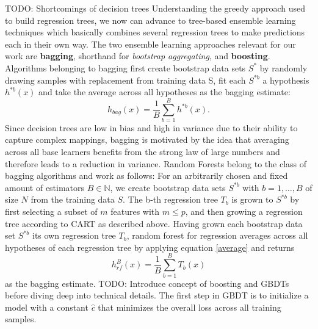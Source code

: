 \newline
\newline
TODO: Shortcomings of decision trees
\newline
\newline
Understanding the greedy approach used to build regression trees, we now can advance to tree-based ensemble learning techniques which basically combines several regression trees to make predictions each in their own way. 
The two ensemble learning approaches relevant for our work are \textbf{bagging}, shorthand for \textit{bootstrap aggregating}, and \textbf{boosting}. 
Algorithms belonging to bagging first create bootstrap data sets $ S^{*} $ by randomly drawing samples with replacement from training data S, fit each $ S^{*b} $ a hypothesis $ h^{*b}(x) $ and take the average across all hypotheses as the bagging estimate: 
\begin{equation}\label{average}
	h_{bag}(x) = \dfrac{1}{B} \sum_{b=1}^{B} h^{*b}(x).
\end{equation}
Since decision trees are low in bias and high in variance due to their ability to capture complex mappings, bagging is motivated by the idea that averaging across all base learners benefits from the strong law of large numbers and therefore leads to a reduction in variance. 
Random Forests belong to the class of bagging algorithms and work as follows:
For an arbitrarily chosen and fixed amount of estimators $ B \in \mathbb{N}$, we create bootstrap data sets $ S^{*b} $ with $ b = 1, \dots, B $ of size $ N $ from the training data $ S $. The b-th regression tree $ T_b $ is grown to $ S^{*b} $ by first selecting a subset of $ m $ features with $ m \leq p $, and then growing a regression tree according to CART as described above.
Having grown each bootstrap data set $ S^{*b} $ its own regression tree $ T_b $, random forest for regression averages across all hypotheses of each regression tree by applying equation \ref{average} and returns
\begin{equation}
h^{B}_{rf}(x) = \dfrac{1}{B} \sum_{b=1}^{B} T_b(x)
\end{equation}
as the bagging estimate.
\newline
\newline
TODO: Introduce concept of boosting and GBDTs before diving deep into technical details.
\newline
\newline
The first step in GBDT is to initialize a model with a constant $ \hat{c} $ that minimizes the overall loss across all training samples.
